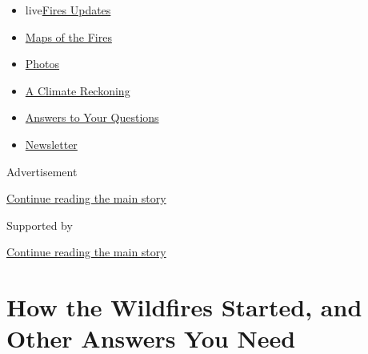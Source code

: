 \begin{itemize}
\tightlist
\item
  live\href{https://www.nytimes3xbfgragh.onion/2020/09/12/us/wildfires-live-updates.html?name=styln-california-wildfires\&region=TOP_BANNER\&block=storyline_menu_recirc\&action=click\&pgtype=Article\&impression_id=9e617f50-f52b-11ea-8531-a121d852b25e\&variant=undefined}{Fires
  Updates}
\item
  \href{https://www.nytimes3xbfgragh.onion/interactive/2020/us/fires-map-tracker.html?name=styln-california-wildfires\&region=TOP_BANNER\&block=storyline_menu_recirc\&action=click\&pgtype=Article\&impression_id=9e617f51-f52b-11ea-8531-a121d852b25e\&variant=undefined}{Maps
  of the Fires}
\item
  \href{https://www.nytimes3xbfgragh.onion/article/wildfires-photos-california-oregon-washington-state.html?name=styln-california-wildfires\&region=TOP_BANNER\&block=storyline_menu_recirc\&action=click\&pgtype=Article\&impression_id=9e617f52-f52b-11ea-8531-a121d852b25e\&variant=undefined}{Photos}
\item
  \href{https://www.nytimes3xbfgragh.onion/2020/09/10/us/climate-change-california-wildfires.html?name=styln-california-wildfires\&region=TOP_BANNER\&block=storyline_menu_recirc\&action=click\&pgtype=Article\&impression_id=9e617f53-f52b-11ea-8531-a121d852b25e\&variant=undefined}{A
  Climate Reckoning}
\item
  \href{https://www.nytimes3xbfgragh.onion/article/wildfires-california-oregon-washington.html?name=styln-california-wildfires\&region=TOP_BANNER\&block=storyline_menu_recirc\&action=click\&pgtype=Article\&impression_id=9e617f54-f52b-11ea-8531-a121d852b25e\&variant=undefined}{Answers
  to Your Questions}
\item
  \href{https://www.nytimes3xbfgragh.onion/2020/09/09/us/california-wildfires.html?name=styln-california-wildfires\&region=TOP_BANNER\&block=storyline_menu_recirc\&action=click\&pgtype=Article\&impression_id=9e617f55-f52b-11ea-8531-a121d852b25e\&variant=undefined}{Newsletter}
\end{itemize}

Advertisement

\protect\hyperlink{after-top}{Continue reading the main story}

Supported by

\protect\hyperlink{after-sponsor}{Continue reading the main story}

\hypertarget{how-the-wildfires-started-and-other-answers-you-need}{%
\section{How the Wildfires Started, and Other Answers You
Need}\label{how-the-wildfires-started-and-other-answers-you-need}}

